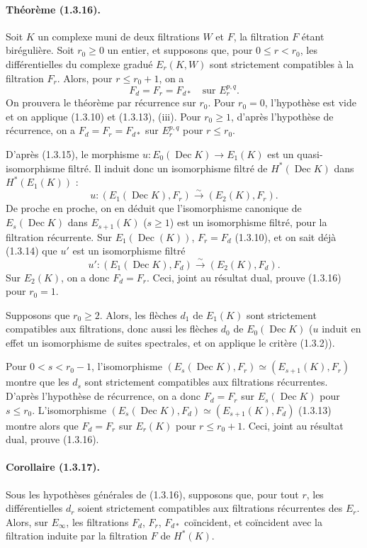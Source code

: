 \documentclass[10pt]{article}
\newcommand{\iso}{\xrightarrow{\sim}}
\newcommand{\Dec}{\operatorname{Dec}}
\begin{document}
\paragraph{Théorème (1.3.16).} Soit $K$ un complexe muni de deux filtrations $W$ et $F$, la filtration $F$ étant birégulière. Soit $r_0\ge0$ un entier, et supposons que, pour $0\le r<r_0$, les différentielles du complexe gradué $E_r(K,W)$ sont strictement compatibles à la filtration $F_r$. Alors, pour $r\le r_0+1$, on a
\[
F_d=F_r=F_{d*}\quad\text{sur }E_r^{p,q}.
\]
On prouvera le théorème par récurrence sur $r_0$. Pour $r_0=0$, l'hypothèse est vide et on applique (1.3.10) et (1.3.13), (iii). Pour $r_0\ge1$, d'après l'hypothèse de récurrence, on a $F_d=F_r=F_{d*}$ sur $E_r^{p,q}$ pour $r\le r_0$.

D'après (1.3.15), le morphisme $u:E_0(\Dec K)\to E_1(K)$ est un quasi-isomorphisme filtré. Il induit donc un isomorphisme filtré de $H^*(\Dec K)$ dans $H^*(E_1(K))$ :
\[
u:(E_1(\Dec K),F_r)\iso(E_2(K),F_r).
\]
De proche en proche, on en déduit que l'isomorphisme canonique de $E_s(\Dec K)$ dans $E_{s+1}(K)$ ($s\ge1$) est un isomorphisme filtré, pour la filtration récurrente. Sur $E_1(\Dec(K))$, $F_r=F_d$ (1.3.10), et on sait déjà (1.3.14) que $u'$ est un isomorphisme filtré
\[
u':(E_1(\Dec K),F_d)\iso(E_2(K),F_d).
\]
Sur $E_2(K)$, on a donc $F_d=F_r$. Ceci, joint au résultat dual, prouve (1.3.16) pour $r_0=1$.

Supposons que $r_0\ge2$. Alors, les flèches $d_1$ de $E_1(K)$ sont strictement compatibles aux filtrations, donc aussi les flèches $d_0$ de $E_0(\Dec K)$ ($u$ induit en effet un isomorphisme de suites spectrales, et on applique le critère (1.3.2)).

Pour $0<s<r_0-1$, l'isomorphisme $(E_s(\Dec K),F_r)\simeq(E_{s+1}(K),F_r)$ montre que les $d_s$ sont strictement compatibles aux filtrations récurrentes. D'après l'hypothèse de récurrence, on a donc $F_d=F_r$ sur $E_s(\Dec K)$ pour $s\le r_0$. L'isomorphisme $(E_s(\Dec K),F_d)\simeq(E_{s+1}(K),F_d)$ (1.3.13) montre alors que $F_d=F_r$ sur $E_r(K)$ pour $r\le r_0+1$. Ceci, joint au résultat dual, prouve (1.3.16).

\paragraph{Corollaire (1.3.17).} Sous les hypothèses générales de (1.3.16), supposons que, pour tout $r$, les différentielles $d_r$ soient strictement compatibles aux filtrations récurrentes des $E_r$. Alors, sur $E_\infty$, les filtrations $F_d$, $F_r$, $F_{d*}$ coïncident, et coïncident avec la filtration induite par la filtration $F$ de $H^*(K)$.
\end{document}
